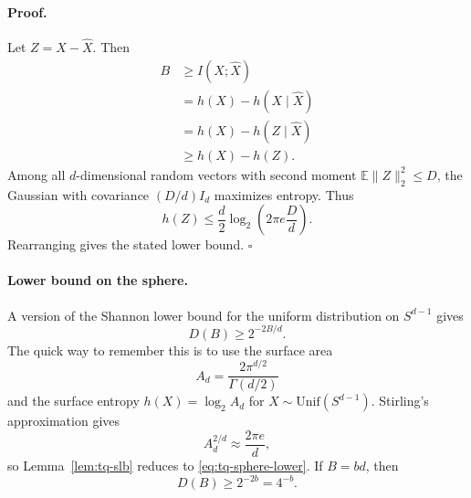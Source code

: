 \paragraph{Proof.}
Let $Z=X-\widehat X$.
Then
\begin{align}
    B
    &\ge I(X;\widehat X)\\
    &=h(X)-h(X\mid \widehat X)\\
    &=h(X)-h(Z\mid \widehat X)\\
    &\ge h(X)-h(Z).
\end{align}
Among all $d$-dimensional random vectors with second moment $\mathbb E\|Z\|_2^2\le D$, the Gaussian with covariance $(D/d)I_d$ maximizes entropy.
Thus
\begin{equation}
    h(Z)
    \le \frac d2\log_2\left(2\pi e\frac{D}{d}\right).
\end{equation}
Rearranging gives the stated lower bound.
\hfill$\square$

\paragraph{Lower bound on the sphere.}
A version of the Shannon lower bound for the uniform distribution on $S^{d-1}$ gives
\begin{equation}
\label{eq:tq-sphere-lower}
    D(B)\ge 2^{-2B/d}.
\end{equation}
The quick way to remember this is to use the surface area
\begin{equation}
    A_d=\frac{2\pi^{d/2}}{\Gamma(d/2)}
\end{equation}
and the surface entropy $h(X)=\log_2 A_d$ for $X\sim\mathrm{Unif}(S^{d-1})$.
Stirling's approximation gives
\begin{equation}
    A_d^{2/d}\approx \frac{2\pi e}{d},
\end{equation}
so Lemma~\ref{lem:tq-slb} reduces to \eqref{eq:tq-sphere-lower}.
If $B=bd$, then
\begin{equation}
    D(B)\ge 2^{-2b}=4^{-b}.
\end{equation}


